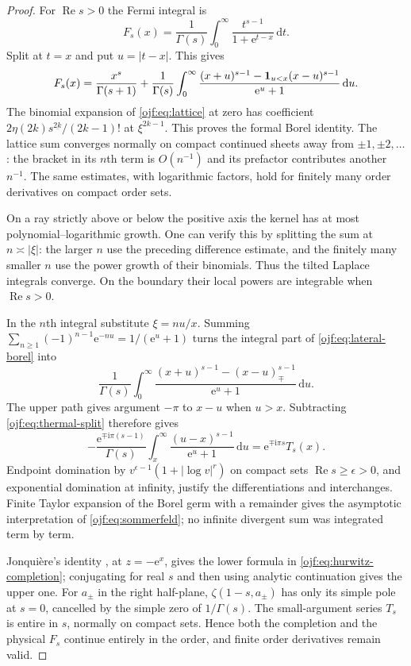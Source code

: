 \documentclass[11pt,a4paper]{article}
\numberwithin{equation}{section}
\theoremstyle{definition}\newtheorem{definition}[theorem]{Definition}
\theoremstyle{remark}\newtheorem{remark}[theorem]{Remark}
\newcommand{\ee}{\mathrm e}\newcommand{\ii}{\mathrm i}\newcommand{\dd}{\,\mathrm d}
\newcommand{\Rea}{\operatorname{Re}}\newcommand{\Ima}{\operatorname{Im}}
\begin{document}
\begin{proof}
For $\Rea s>0$ the Fermi integral is
\[
 F_s(x)=\frac1{\Gamma(s)}\int_0^\infty
                    \frac{t^{s-1}}{1+\ee^{t-x}}\dd t.
\]
Split at $t=x$ and put $u=|t-x|$. This gives
\begin{equation}\label{ojf:eq:thermal-split}
 F_s(x)=\frac{x^s}{\Gamma(s+1)}+
 \frac1{\Gamma(s)}\int_0^\infty
 \frac{(x+u)^{s-1}-{\bf1}_{u<x}(x-u)^{s-1}}{\ee^u+1}\dd u.
\end{equation}
The binomial expansion of \eqref{ojf:eq:lattice} at zero has coefficient
$2\eta(2k)s^{\underline{2k}}/(2k-1)!$ at $\xi^{2k-1}$.
This proves the formal Borel identity. The lattice sum converges normally
on compact continued sheets away from $\pm1,\pm2,\ldots$: the bracket
in its $n$th term is $O(n^{-1})$ and its prefactor contributes another
$n^{-1}$. The same estimates, with logarithmic factors, hold for finitely
many order derivatives on compact order sets.

On a ray strictly above or below the positive axis the kernel has at most
polynomial--logarithmic growth. One can verify this by splitting the sum
at $n\asymp|\xi|$: the larger $n$ use the preceding difference estimate,
and the finitely many smaller $n$ use the power growth of their binomials.
Thus the tilted Laplace integrals converge. On the boundary their local
powers are integrable when $\Rea s>0$.

In the $n$th integral substitute $\xi=nu/x$. Summing
$\sum_{n\ge1}(-1)^{n-1}\ee^{-nu}=1/(\ee^u+1)$ turns the integral part
of \eqref{ojf:eq:lateral-borel} into
\[
 \frac1{\Gamma(s)}\int_0^\infty
 \frac{(x+u)^{s-1}-(x-u)_{\mp}^{s-1}}{\ee^u+1}\dd u.
\]
The upper path gives argument $-\pi$ to $x-u$ when $u>x$.
Subtracting \eqref{ojf:eq:thermal-split} therefore gives
\[
 -\frac{\ee^{\mp\ii\pi(s-1)}}{\Gamma(s)}
  \int_x^\infty\frac{(u-x)^{s-1}}{\ee^u+1}\dd u
   =\ee^{\mp\ii\pi s}T_s(x).
\]
Endpoint domination by $v^{\epsilon-1}(1+|\log v|^r)$ on compact
sets $\Rea s\ge\epsilon>0$, and exponential domination at infinity,
justify the differentiations and interchanges. Finite Taylor expansion
of the Borel germ with a remainder gives the asymptotic interpretation
of \eqref{ojf:eq:sommerfeld}; no infinite divergent sum was integrated
term by term.

Jonqui\`ere's identity \cite[Eq.~25.12.13]{DLMFpoly}, at $z=-\ee^x$,
gives the lower formula in \eqref{ojf:eq:hurwitz-completion}; conjugating
for real $s$ and then using analytic continuation gives the upper one.
For $a_\pm$ in the right half-plane, $\zeta(1-s,a_\pm)$ has only its
simple pole at $s=0$, cancelled by the simple zero of $1/\Gamma(s)$.
The small-argument series $T_s$ is entire in $s$, normally on compact
sets. Hence both the completion and the physical $F_s$ continue
entirely in the order, and finite order derivatives remain valid.
\end{proof}
\end{document}
